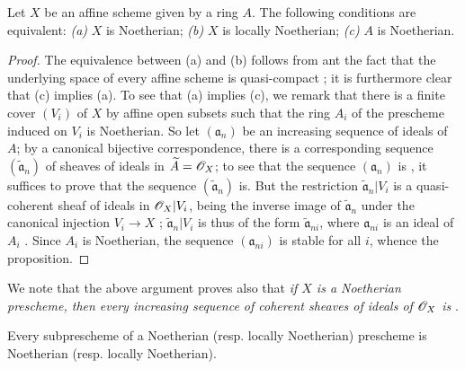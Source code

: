 \begin{proposition}[6.1.3]
\label{I.6.1.3}
Let $X$ be an affine scheme given by a ring $A$.
The following conditions are equivalent:
\emph{(a)} $X$ is Noetherian;
\emph{(b)} $X$ is locally Noetherian;
\emph{(c)} $A$ is Noetherian.
\end{proposition}

\begin{proof}
\label{proof-I.6.1.3}
The equivalence between (a) and (b) follows from  ant the fact that the underlying space of every affine scheme is quasi-compact ; it is furthermore clear that (c) implies (a).
To see that (a) implies (c), we remark that there is a finite cover $(V_i)$ of $X$ by affine open subsets such that the ring $A_i$ of the prescheme induced on $V_i$ is Noetherian.
So let $(\mathfrak{a}_n)$ be an increasing sequence of ideals of $A$; by a canonical bijective correspondence, there is a corresponding sequence $(\widetilde{\mathfrak{a}}_n)$ of sheaves of ideals in $\widetilde{A}=\mathscr{O}_X$;
to see that the sequence $(\mathfrak{a}_n)$ is , it suffices to prove that the sequence $(\widetilde{\mathfrak{a}}_n)$ is.
But the restriction $\widetilde{\mathfrak{a}}_n|V_i$ is a quasi-coherent sheaf of ideals in $\mathscr{O}_X|V_i$, being the inverse image of $\widetilde{\mathfrak{a}}_n$ under the canonical injection $V_i\to X$ ;
$\widetilde{\mathfrak{a}}_n|V_i$ is thus of the form $\widetilde{\mathfrak{a}}_{ni}$, where $\mathfrak{a}_{ni}$ is an ideal of $A_i$ .
Since $A_i$ is Noetherian, the sequence $(\mathfrak{a}_{ni})$ is stable for all $i$, whence the proposition.
\end{proof}

We note that the above argument proves also that \emph{if $X$ is a Noetherian prescheme, then every increasing sequence of coherent sheaves of ideals of $\mathscr{O}_X$ is }.

\begin{proposition}[6.1.4]
\label{I.6.1.4}
Every subprescheme of a Noetherian (resp. locally Noetherian) prescheme is Noetherian (resp. locally Noetherian).
\end{proposition}


